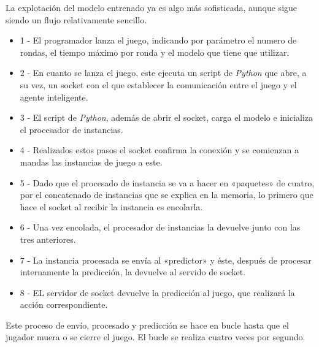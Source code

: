 La explotación del modelo entrenado ya es algo más sofisticada, aunque sigue siendo un flujo relativamente sencillo.
\begin{itemize}
    \item 1 - El programador lanza el juego, indicando por parámetro el numero de rondas, el tiempo máximo por ronda y el modelo que tiene que utilizar.
    \item 2 - En cuanto se lanza el juego, este ejecuta un script de \emph{Python} que abre, a su vez, un socket con el que establecer la comunicación entre el juego y el agente inteligente.
    \item 3 - El script de \emph{Python}, además de abrir el socket, carga el modelo e inicializa el procesador de instancias.
    \item 4 - Realizados estos pasos el socket confirma la conexión y se comienzan a mandas las instancias de juego a este.
    \item 5 - Dado que el procesado de instancia se va a hacer en «paquetes» de cuatro, por el concatenado de instancias que se explica en la memoria, lo primero que hace el socket al recibir la instancia es encolarla.
    \item 6 - Una vez encolada, el procesador de instancias la devuelve junto con las tres anteriores.
    \item 7 - La instancia procesada se envía al «predictor» y éste, después de procesar internamente la predicción, la devuelve al servido de socket.
    \item 8 - EL servidor de socket devuelve la predicción al juego, que realizará la acción correspondiente.
\end{itemize}

Este proceso de envío, procesado y predicción se hace en bucle hasta que el jugador muera o se cierre el juego. El bucle se realiza cuatro veces por segundo.


